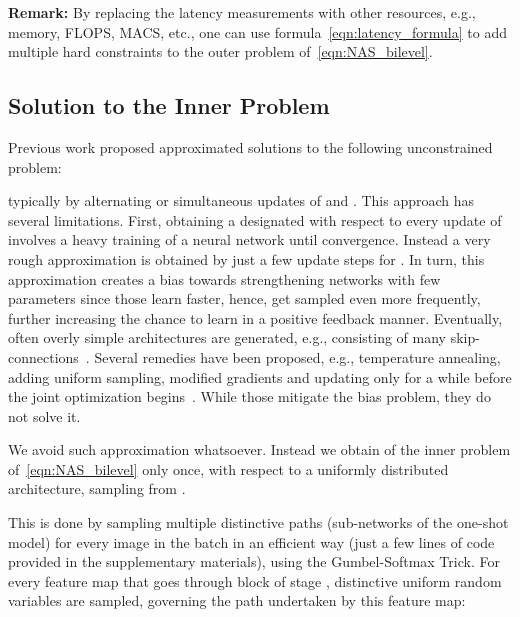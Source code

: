 \documentclass[dvipsnames,table,xcdraw]{article}
\begin{document}
\textbf{Remark:} By replacing the latency measurements  with other resources, e.g., memory, FLOPS, MACS, etc., one can use formula~\eqref{eqn:latency_formula} to add multiple hard constraints to the outer problem of~\eqref{eqn:NAS_bilevel}.

\subsection{Solution to the Inner Problem }
\label{sec:inner_problem}
Previous work proposed approximated solutions to the following unconstrained problem:

typically by alternating or simultaneous updates of  and  \cite{liu2018darts, SNAS, cai2018proxylessnas, fbnet, TF-NAS}.
This approach has several limitations.
First, obtaining a designated  with respect to every update of  involves a heavy training of a neural network until convergence. Instead a very rough approximation is obtained by just a few update steps for .
In turn, this approximation creates a bias towards strengthening networks with few parameters since those learn faster, hence, get sampled even more frequently, further increasing the chance to learn in a positive feedback manner. Eventually, often overly simple architectures are generated, e.g., consisting of many skip-connections~\cite{P-DARTS, DARTS+}. Several remedies have been proposed, e.g., temperature annealing, adding uniform sampling, modified gradients and updating only  for a while before the joint optimization begins~\cite{noy2020asap, fbnet, TF-NAS, nayman2019xnas}. While those mitigate the bias problem, they do not solve it.

We avoid such approximation whatsoever. Instead we obtain  of the inner problem of~\eqref{eqn:NAS_bilevel} only once, with respect to a uniformly distributed architecture, sampling  from .

This is done by sampling multiple distinctive paths (sub-networks of the one-shot model) for every image in the batch in an efficient way (just a few lines of code provided in the supplementary materials), using the Gumbel-Softmax Trick. 
For every feature map  that goes through block  of stage , distinctive uniform random variables  are sampled, governing the path undertaken by this feature map:
\end{document}
